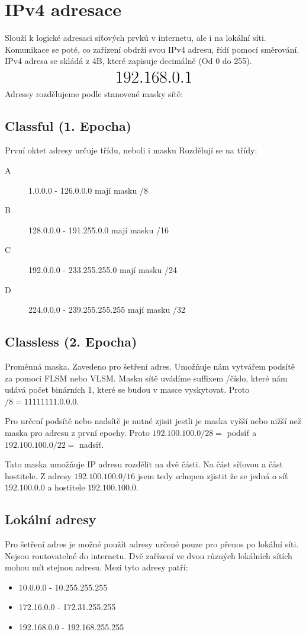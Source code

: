 \section{IPv4 adresace}
\label{sec:ipv4-adresace}
Slouží k logické adresaci síťových prvků v internetu, ale i na lokální síti.
Komunikace se poté, co zařízení obdrží svou IPv4 adresu, řídí pomocí směrování.
IPv4 adresa se skládá z 4B, které zapisuje decimálně (Od 0 do 255).
\[\mathlarger{\mathlarger{\mathlarger{\mathlarger{192.168.0.1}}}}\]
Adressy rozdělujeme podle stanovené masky sítě:
\subsection{Classful (1. Epocha)}
První oktet adresy určuje třídu, neboli i masku
Rozdělují se na třídy:\\
\begin{description}
  \item[A] 1.0.0.0 - 126.0.0.0 mají masku /8
  \item[B] 128.0.0.0 - 191.255.0.0 mají masku /16
  \item[C] 192.0.0.0 - 233.255.255.0 mají masku /24
  \item[D] 224.0.0.0 - 239.255.255.255 mají masku /32
\end{description}
\subsection{Classless (2. Epocha)}
Proměnná maska.
Zavedeno pro šetření adres.
Umožňuje nám vytvářem podsítě za pomoci FLSM nebo VLSM.
Masku sítě uvádíme suffixem /číslo, které nám udává počet binárních 1, které se budou v masce vyskytovat.
Proto $/8 = 1111 1111.0.0.0$.

Pro určení podsítě nebo nadsítě je nutné zjisit jestli je maska vyšší nebo nižší než maska pro adresu z první epochy.
Proto $192.100.100.0/28 =$ podsíť a $192.100.100.0/22 =$ nadsíť.

Tato maska umožňuje IP adresu rozdělit na dvě části.
Na část síťovou a část hostitele.
Z adresy $192.100.100.0/16$ jsem tedy schopen zjistit že se jedná o síť $192.100.0.0$ a hostitele $192.100.100.0$.
\subsection{Lokální adresy}
Pro šetření adres je možné použít adresy určené pouze pro přenos po lokální síti.
Nejsou routovatelné do internetu.
Dvě zařízení ve dvou různých lokálních sítích mohou mít stejnou adresu.
Mezi tyto adresy patří:\\
\begin{itemize}
  \item 10.0.0.0 - 10.255.255.255
  \item 172.16.0.0 - 172.31.255.255
  \item 192.168.0.0 - 192.168.255.255
\end{itemize}
